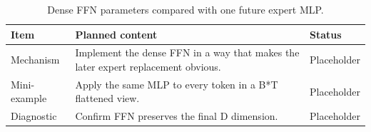 \begin{table}[H]
\centering
\caption{Dense FFN parameters compared with one future expert MLP.}
\label{tab:ch02-dense-feed-forward-block-as-the-replacement-target}
\begin{tabularx}{\textwidth}{p{}X p{}}
\toprule
Item & Planned content & Status \\
\midrule
Mechanism & Implement the dense FFN in a way that makes the later expert replacement obvious. & Placeholder \\
Mini-example & Apply the same MLP to every token in a B*T flattened view. & Placeholder \\
Diagnostic & Confirm FFN preserves the final D dimension. & Placeholder \\
\bottomrule
\end{tabularx}
\end{table}
